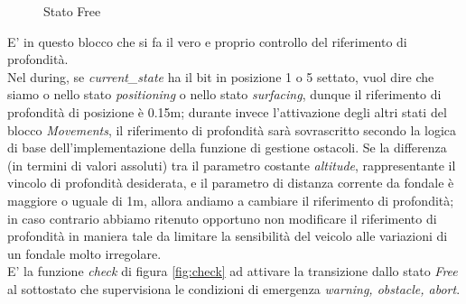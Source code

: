 \documentclass{article}
\begin{document}
            
            \begin{figure} [ht]
                \caption{Stato Free}
                \label{fig:free}
            \end{figure}

            E' in questo blocco che si fa il vero e proprio controllo del riferimento di profondità.\\
            Nel during, se \emph{current\_state} ha il bit in posizione 1 o 5 settato, vuol dire che siamo o nello stato \emph{positioning} o nello stato \emph{surfacing},
            dunque il riferimento di profondità di posizione è 0.15m; durante invece l'attivazione degli altri stati del blocco \emph{Movements}, 
            il riferimento di profondità sarà sovrascritto secondo la logica di base dell'implementazione della funzione di
            gestione ostacoli. Se la differenza (in termini di valori assoluti) tra il parametro costante \emph{altitude}, rappresentante il vincolo di profondità desiderata,
            e il parametro di distanza corrente da fondale è maggiore o uguale di 1m, allora andiamo a cambiare il riferimento di profondità; in caso contrario
            abbiamo ritenuto opportuno non modificare il riferimento di profondità in maniera tale da limitare la sensibilità
            del veicolo alle variazioni di un fondale molto irregolare.\\

            E' la funzione \emph{check} di figura \ref{fig:check} ad attivare la transizione dallo stato \emph{Free} al sottostato che supervisiona le condizioni di 
            emergenza \emph{warning, obstacle, abort}. 
\end{document}
